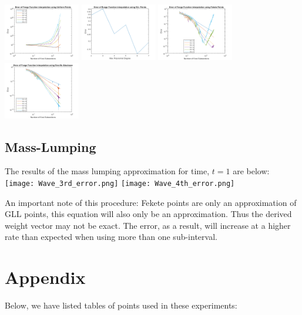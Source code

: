 \documentclass{article}
\begin{document}
\hspace*{-0.5cm}\includegraphics[height = 2.5cm]{RungeUniform.png} \includegraphics[height = 2.5cm]{RungeGLL.png}
\includegraphics[height = 2.5cm]{RungeFekete.png} \includegraphics[height = 2.5cm]{RungeGreville.png}

\subsection*{Mass-Lumping}
The results of the mass lumping approximation for time, $t=1$ are below:
\newline\hspace*{-0.5cm}
\texttt{[image: Wave\_3rd\_error.png]} \texttt{[image: Wave\_4th\_error.png]}

An important note of this procedure: Fekete points are only an approximation of GLL points, this equation will also only be an approximation. Thus the derived weight vector may not be exact. The error, as a result, will increase at a higher rate than expected when using more than one sub-interval.


\section*{Appendix}
Below, we have listed tables of points used in these experiments:
\end{document}
